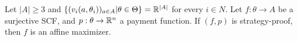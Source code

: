 \begin{thm}
  \label{sec:mech-with-paym-11}
  Let $|A| \geq 3$  and $\{ (v_{i}(a, \theta_{i}))_{a \in A} | \theta
  \in \Theta \} = \mathbb{R}^{|A|}$ for every $i \in N$. Let $f: \theta
  \rightarrow A$ be a surjective SCF, and $p: \theta \rightarrow
  \mathbb{R}^{n}$ a payment function.  If $(f, p)$ is strategy-proof, then $f$
  is an affine maximizer.
\end{thm}



